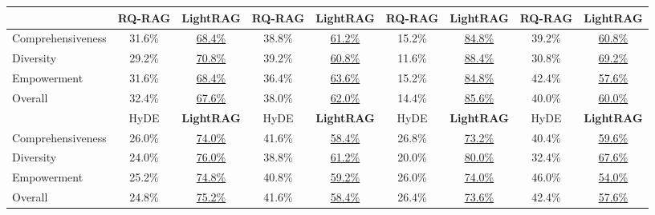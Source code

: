 \begin{table}[t]
{\begin{tabular}{@{}lcccccccc@{}}
\cmidrule(lr){2-3} \cmidrule(lr){4-5} \cmidrule(lr){6-7} \cmidrule(lr){8-9}
                      & RQ-RAG & \textbf{LightRAG} & RQ-RAG & \textbf{LightRAG} & RQ-RAG & \textbf{LightRAG} & RQ-RAG & \textbf{LightRAG} \\
\midrule
Comprehensiveness      & 31.6\%      & \underline{68.4\%}     & 38.8\%      & \underline{61.2\%}     & 15.2\%      & \underline{84.8\%}     & 39.2\%      & \underline{60.8\%}     \\
Diversity              & 29.2\%      & \underline{70.8\%}     & 39.2\%      & \underline{60.8\%}     & 11.6\%      & \underline{88.4\%}     & 30.8\%      & \underline{69.2\%}     \\
Empowerment            & 31.6\%      & \underline{68.4\%}     & 36.4\%      & \underline{63.6\%}     & 15.2\%      & \underline{84.8\%}     & 42.4\%      & \underline{57.6\%}     \\
Overall         & 32.4\%      & \underline{67.6\%}     & 38.0\%      & \underline{62.0\%}     & 14.4\%      & \underline{85.6\%}     & 40.0\%      & \underline{60.0\%}     \\
\cmidrule(lr){2-3} \cmidrule(lr){4-5} \cmidrule(lr){6-7} \cmidrule(lr){8-9}
                      & HyDE & \textbf{LightRAG} & HyDE & \textbf{LightRAG} & HyDE & \textbf{LightRAG} & HyDE & \textbf{LightRAG} \\
\midrule
Comprehensiveness      & 26.0\%      & \underline{74.0\%}     & 41.6\%      & \underline{58.4\%}     & 26.8\%      & \underline{73.2\%}     & 40.4\%      & \underline{59.6\%}     \\
Diversity              & 24.0\%      & \underline{76.0\%}     & 38.8\%      & \underline{61.2\%}     & 20.0\%      & \underline{80.0\%}     & 32.4\%      & \underline{67.6\%}     \\
Empowerment            & 25.2\%      & \underline{74.8\%}     & 40.8\%      & \underline{59.2\%}     & 26.0\%      & \underline{74.0\%}     & 46.0\%      & \underline{54.0\%}     \\
Overall         & 24.8\%      & \underline{75.2\%}     & 41.6\%      & \underline{58.4\%}     & 26.4\%      & \underline{73.6\%}     & 42.4\%      & \underline{57.6\%}     \\

\end{tabular}}
\end{table}
